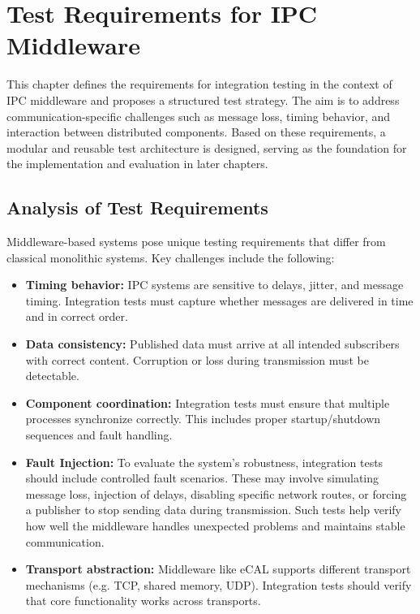 \clearpage

\section{Test Requirements for IPC Middleware}

This chapter defines the requirements for integration testing in the context of IPC middleware and proposes a structured test strategy. The aim is to address communication-specific challenges such as message loss, timing behavior, and interaction between distributed components. Based on these requirements, a modular and reusable test architecture is designed, serving as the foundation for the implementation and evaluation in later chapters.

\subsection{Analysis of Test Requirements}

Middleware-based systems pose unique testing requirements that differ from classical monolithic systems. Key challenges include the following:

\begin{itemize}
	\item \textbf{Timing behavior:} IPC systems are sensitive to delays, jitter, and message timing. Integration tests must capture whether messages are delivered in time and in correct order.
	
	\item \textbf{Data consistency:} Published data must arrive at all intended subscribers with correct content. Corruption or loss during transmission must be detectable.
	
	\item \textbf{Component coordination:} Integration tests must ensure that multiple processes synchronize correctly. This includes proper startup/shutdown sequences and fault handling.
	
	\item \textbf{Fault Injection:} To evaluate the system’s robustness, integration tests should include controlled fault scenarios. These may involve simulating message loss, injection of delays, disabling specific network routes, or forcing a publisher to stop sending data during transmission. Such tests help verify how well the middleware handles unexpected problems and maintains stable communication.
	
	\item \textbf{Transport abstraction:} Middleware like eCAL supports different transport mechanisms (e.g. TCP, shared memory, UDP). Integration tests should verify that core functionality works across transports.
\end{itemize}


